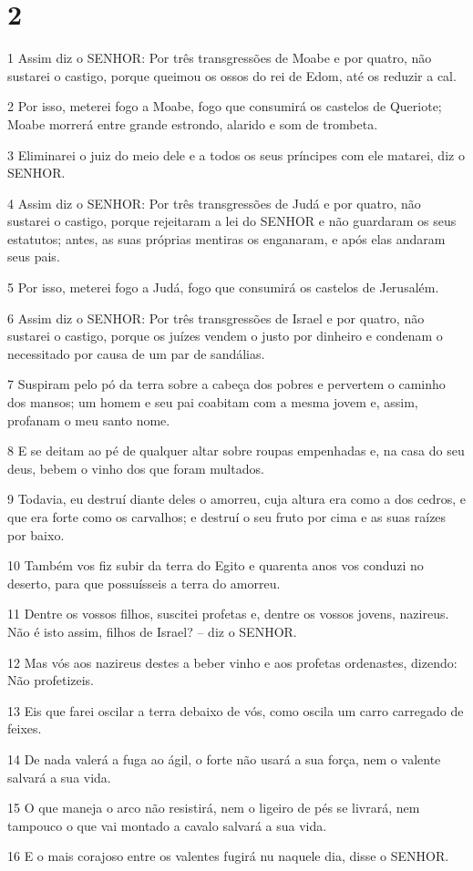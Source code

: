 \chapter{2}

\par 1 Assim diz o SENHOR: Por três transgressões de Moabe e por quatro, não sustarei o castigo, porque queimou os ossos do rei de Edom, até os reduzir a cal.
\par 2 Por isso, meterei fogo a Moabe, fogo que consumirá os castelos de Queriote; Moabe morrerá entre grande estrondo, alarido e som de trombeta.
\par 3 Eliminarei o juiz do meio dele e a todos os seus príncipes com ele matarei, diz o SENHOR.
\par 4 Assim diz o SENHOR: Por três transgressões de Judá e por quatro, não sustarei o castigo, porque rejeitaram a lei do SENHOR e não guardaram os seus estatutos; antes, as suas próprias mentiras os enganaram, e após elas andaram seus pais.
\par 5 Por isso, meterei fogo a Judá, fogo que consumirá os castelos de Jerusalém.
\par 6 Assim diz o SENHOR: Por três transgressões de Israel e por quatro, não sustarei o castigo, porque os juízes vendem o justo por dinheiro e condenam o necessitado por causa de um par de sandálias.
\par 7 Suspiram pelo pó da terra sobre a cabeça dos pobres e pervertem o caminho dos mansos; um homem e seu pai coabitam com a mesma jovem e, assim, profanam o meu santo nome.
\par 8 E se deitam ao pé de qualquer altar sobre roupas empenhadas e, na casa do seu deus, bebem o vinho dos que foram multados.
\par 9 Todavia, eu destruí diante deles o amorreu, cuja altura era como a dos cedros, e que era forte como os carvalhos; e destruí o seu fruto por cima e as suas raízes por baixo.
\par 10 Também vos fiz subir da terra do Egito e quarenta anos vos conduzi no deserto, para que possuísseis a terra do amorreu.
\par 11 Dentre os vossos filhos, suscitei profetas e, dentre os vossos jovens, nazireus. Não é isto assim, filhos de Israel? -- diz o SENHOR.
\par 12 Mas vós aos nazireus destes a beber vinho e aos profetas ordenastes, dizendo: Não profetizeis.
\par 13 Eis que farei oscilar a terra debaixo de vós, como oscila um carro carregado de feixes.
\par 14 De nada valerá a fuga ao ágil, o forte não usará a sua força, nem o valente salvará a sua vida.
\par 15 O que maneja o arco não resistirá, nem o ligeiro de pés se livrará, nem tampouco o que vai montado a cavalo salvará a sua vida.
\par 16 E o mais corajoso entre os valentes fugirá nu naquele dia, disse o SENHOR.

